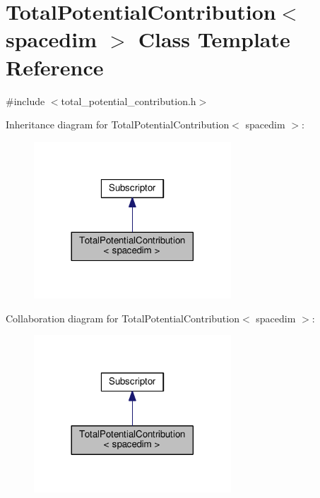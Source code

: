 \hypertarget{class_total_potential_contribution}{}\section{Total\+Potential\+Contribution$<$ spacedim $>$ Class Template Reference}
\label{class_total_potential_contribution}


{\ttfamily \#include $<$total\+\_\+potential\+\_\+contribution.\+h$>$}



Inheritance diagram for Total\+Potential\+Contribution$<$ spacedim $>$\+:
\nopagebreak
\begin{figure}[H]
\begin{center}
\leavevmode
\includegraphics[width=209pt]{class_total_potential_contribution__inherit__graph}
\end{center}
\end{figure}


Collaboration diagram for Total\+Potential\+Contribution$<$ spacedim $>$\+:
\nopagebreak
\begin{figure}[H]
\begin{center}
\leavevmode
\includegraphics[width=209pt]{class_total_potential_contribution__coll__graph}
\end{center}
\end{figure}
